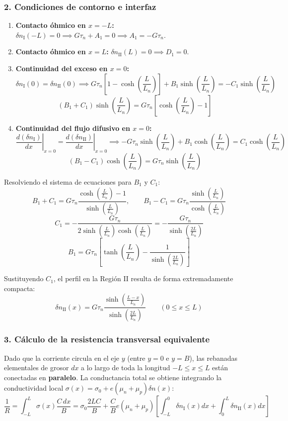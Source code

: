 \begin{problema}
\subsubsection*{2. Condiciones de contorno e interfaz}
\begin{enumerate}[label=\arabic*.]
    \item \textbf{Contacto óhmico en $x = -L$:} $\delta n_{\text{I}}(-L) = 0 \implies G \tau_n + A_1 = 0 \implies A_1 = -G \tau_n$.
    \item \textbf{Contacto óhmico en $x = L$:} $\delta n_{\text{II}}(L) = 0 \implies D_1 = 0$.
    \item \textbf{Continuidad del exceso en $x = 0$:}
    \[
    \delta n_{\text{I}}(0) = \delta n_{\text{II}}(0) \implies G \tau_n \left[ 1 - \cosh\left(\frac{L}{L_n}\right) \right] + B_1 \sinh\left(\frac{L}{L_n}\right) = -C_1 \sinh\left(\frac{L}{L_n}\right)
    \]
    \[
    (B_1 + C_1) \sinh\left(\frac{L}{L_n}\right) = G \tau_n \left[ \cosh\left(\frac{L}{L_n}\right) - 1 \right]
    \]
    \item \textbf{Continuidad del flujo difusivo en $x = 0$:}
    \[
    \left. \frac{d(\delta n_{\text{I}})}{dx} \right|_{x=0} = \left. \frac{d(\delta n_{\text{II}})}{dx} \right|_{x=0} \implies -G \tau_n \sinh\left(\frac{L}{L_n}\right) + B_1 \cosh\left(\frac{L}{L_n}\right) = C_1 \cosh\left(\frac{L}{L_n}\right)
    \]
    \[
    (B_1 - C_1) \cosh\left(\frac{L}{L_n}\right) = G \tau_n \sinh\left(\frac{L}{L_n}\right)
    \]
\end{enumerate}

Resolviendo el sistema de ecuaciones para $B_1$ y $C_1$:
\[
B_1 + C_1 = G \tau_n \frac{\cosh\left(\frac{L}{L_n}\right) - 1}{\sinh\left(\frac{L}{L_n}\right)}, \qquad B_1 - C_1 = G \tau_n \frac{\sinh\left(\frac{L}{L_n}\right)}{\cosh\left(\frac{L}{L_n}\right)}
\]
\[
C_1 = -\frac{G \tau_n}{2 \sinh\left(\frac{L}{L_n}\right) \cosh\left(\frac{L}{L_n}\right)} = -\frac{G \tau_n}{\sinh\left(\frac{2L}{L_n}\right)}
\]
\[
B_1 = G \tau_n \left[ \tanh\left(\frac{L}{L_n}\right) - \frac{1}{\sinh\left(\frac{2L}{L_n}\right)} \right]
\]

Sustituyendo $C_1$, el perfil en la Región II resulta de forma extremadamente compacta:
\[
\delta n_{\text{II}}(x) = G \tau_n \frac{\sinh\left(\frac{L-x}{L_n}\right)}{\sinh\left(\frac{2L}{L_n}\right)} \qquad (0 \le x \le L)
\]

\subsubsection*{3. Cálculo de la resistencia transversal equivalente}
Dado que la corriente circula en el eje $y$ (entre $y=0$ e $y=B$), las rebanadas elementales de grosor $dx$ a lo largo de toda la longitud $-L \le x \le L$ están conectadas en \textbf{paralelo}. La conductancia total se obtiene integrando la conductividad local $\sigma(x) = \sigma_0 + e(\mu_n + \mu_p)\delta n(x)$:
\[
\frac{1}{R} = \int_{-L}^{L} \sigma(x) \frac{C \, dx}{B} = \sigma_0 \frac{2 L C}{B} + \frac{C}{B} e (\mu_n + \mu_p) \left[ \int_{-L}^0 \delta n_{\text{I}}(x) dx + \int_0^L \delta n_{\text{II}}(x) dx \right]
\]


\end{problema}
